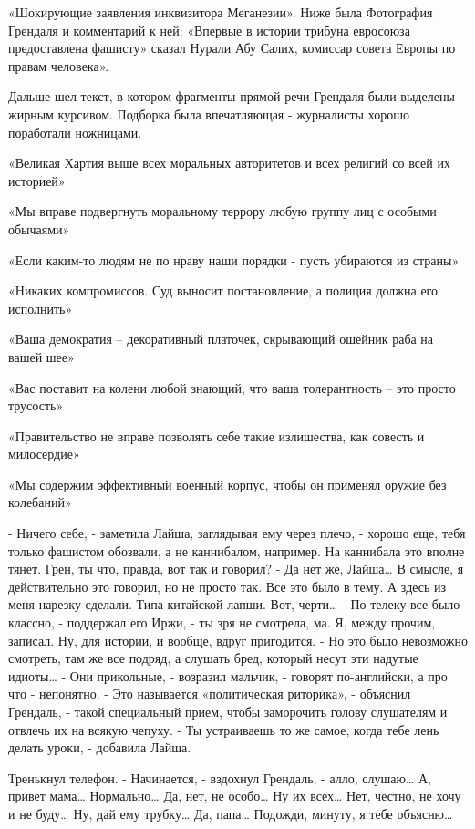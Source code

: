 \documentclass[10pt,final]{book}
\begin{document}
«Шокирующие заявления инквизитора Меганезии». Ниже была Фотография Грендаля и комментарий к ней: «Впервые в истории трибуна евросоюза предоставлена фашисту» сказал Нурали Абу Салих, комиссар совета Европы по правам человека».

Дальше шел текст, в котором фрагменты прямой речи Грендаля были выделены жирным курсивом. Подборка была впечатляющая - журналисты хорошо поработали ножницами.

«Великая Хартия выше всех моральных авторитетов и всех религий со всей их историей»

«Мы вправе подвергнуть моральному террору любую группу лиц с особыми обычаями»

«Если каким-то людям не по нраву наши порядки - пусть убираются из страны»

«Никаких компромиссов. Суд выносит постановление, а полиция должна его исполнить»

«Ваша демократия -- декоративный платочек, скрывающий ошейник раба на вашей шее»

«Вас поставит на колени любой знающий, что ваша толерантность -- это просто трусость»

«Правительство не вправе позволять себе такие излишества, как совесть и милосердие»

«Мы содержим эффективный военный корпус, чтобы он применял оружие без колебаний»

- Ничего себе, - заметила Лайша, заглядывая ему через плечо, - хорошо еще, тебя только фашистом обозвали, а не каннибалом, например. На каннибала это вполне тянет. Грен, ты что, правда, вот так и говорил?
- Да нет же, Лайша\ldots{} В смысле, я действительно это говорил, но не просто так. Все это было в тему. А здесь из меня нарезку сделали. Типа китайской лапши. Вот, черти\ldots{}
- По телеку все было классно, - поддержал его Иржи, - ты зря не смотрела, ма. Я, между прочим, записал. Ну, для истории, и вообще, вдруг пригодится.
- Но это было невозможно смотреть, там же все подряд, а слушать бред, который несут эти надутые идиоты\ldots{}
- Они прикольные, - возразил мальчик, - говорят по-английски, а про что - непонятно.
- Это называется «политическая риторика», - объяснил Грендаль, - такой специальный прием, чтобы заморочить голову слушателям и отвлечь их на всякую чепуху.
- Ты устраиваешь то же самое, когда тебе лень делать уроки, - добавила Лайша.

Тренькнул телефон.
- Начинается, - вздохнул Грендаль, - алло, слушаю\ldots{} А, привет мама\ldots{} Нормально\ldots{} Да, нет, не особо\ldots{} Ну их всех\ldots{} Нет, честно, не хочу и не буду\ldots{} Ну, дай ему трубку\ldots{} Да, папа\ldots{} Подожди, минуту, я тебе объясню\ldots{}
\end{document}
